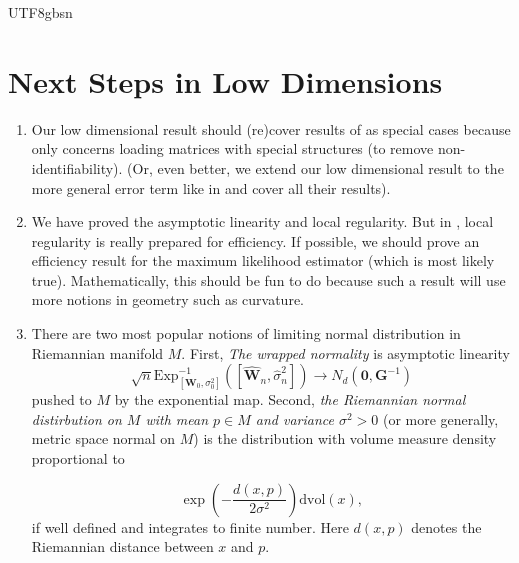 \documentclass[12pt]{report}
\newcommand{\bracket}[1]{\left ( #1 \right )}
\newcommand{\squared}[1]{\left [ #1 \right ]}
\theoremstyle{plain}
\theoremstyle{definition}
\begin{document}
\begin{CJK*}{UTF8}{gbsn}
\section{Next Steps in Low Dimensions}

\begin{enumerate}
  \item Our low dimensional result should (re)cover 
  results of \cite{Anderson_Amemiya_1988} as special cases
  because \cite{Anderson_Amemiya_1988} only concerns loading matrices 
  with special structures (to remove non-identifiability).
  (Or, even better, we extend our low dimensional result 
  to the more general error term like in 
  \cite{Anderson_Amemiya_1988} and cover all their results).
  \item We have proved the asymptotic linearity and local regularity.
  But in \cite{Sun_Lin_Liu_2026}, local regularity is really prepared 
  for efficiency. If possible, we should prove an efficiency result
  for the maximum likelihood estimator (which is most likely true).
  Mathematically, this should be fun to do because such a result 
  will use more notions in geometry such as curvature.
  \item There are two most popular notions of limiting normal distribution in 
   Riemannian manifold $M$.
  First, \textit{The wrapped normality} is asymptotic linearity 
  \begin{equation*}
    \sqrt{n} \text{Exp}^{-1}_{[\bm{W}_0, \sigma_0^2]}
    \bracket{\squared{\hat{\bm{W}}_n, \hat{\sigma}_n^2}}
  \to N_d(\bm{0}, \bm{G}^{-1})
  \end{equation*}
  pushed to $M$ by the exponential map.
  Second, \textit{the Riemannian normal distirbution on $M$
  with mean $p \in M$ and variance $\sigma^2 > 0$}
  (or more generally, metric space normal on $M$)
  is the distribution with volume measure density proportional to 

  \begin{equation*}
    \exp \bracket{- \frac{d(x, p)}{2 \sigma^2}} \mathrm{d} \text{vol}(x),
  \end{equation*}
  if well defined and integrates to finite number.
  Here $d(x,p)$ denotes the Riemannian distance between $x$ and $p$.


\end{enumerate}
\end{CJK*}
\end{document}
